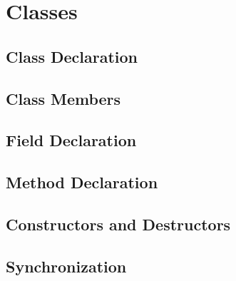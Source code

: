 
\chapter{Classes}

\section{Class Declaration}
\section{Class Members}
\section{Field Declaration}
\section{Method Declaration}
\section{Constructors and Destructors}
\section{Synchronization}
